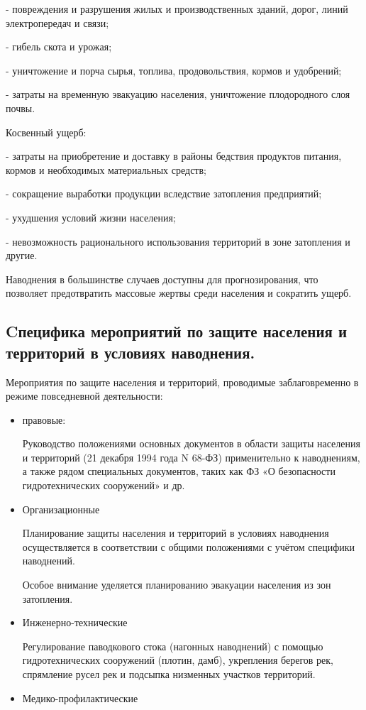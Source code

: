 \documentclass[a4paper, 12pt]{article}
\theoremstyle{definition}
\begin{document}
        - повреждения и разрушения жилых и производственных зданий, дорог, линий электропередач и связи;

        - гибель скота и урожая;

        - уничтожение и порча сырья, топлива, продовольствия, кормов и удобрений;

        - затраты на временную эвакуацию населения, уничтожение плодородного слоя почвы.

        Косвенный ущерб:

        - затраты на приобретение и доставку в районы бедствия продуктов питания, кормов и необходимых материальных средств;

        - сокращение выработки продукции вследствие затопления предприятий;

        - ухудшения условий жизни населения;

        - невозможность рационального использования территорий в зоне затопления и другие.
    
        Наводнения в большинстве случаев доступны для прогнозирования, что позволяет предотвратить массовые жертвы среди населения и сократить ущерб.

        \subsection{Cпецифика мероприятий по защите населения и территорий в условиях наводнения.}

        Мероприятия по защите населения и территорий, проводимые заблаговременно в режиме повседневной деятельности:

        \begin{itemize}
            \item правовые:
            
            Руководство положениями основных документов в области защиты населения и территорий (21 декабря 1994 года N 68-ФЗ) применительно к наводнениям, а также рядом специальных документов, таких как ФЗ «О безопасности гидротехнических сооружений» и др.
            \item Организационные 
            
            Планирование защиты населения и территорий в условиях наводнения осуществляется в соответствии с общими положениями с учётом специфики наводнений.

            Особое внимание уделяется планированию
            эвакуации населения из зон затопления.
            \item Инженерно-технические 
            
            Регулирование паводкового стока (нагонных наводнений) с помощью гидротехнических сооружений (плотин, дамб), укрепления берегов рек, спрямление русел рек и подсыпка низменных участков территорий.
            \item Медико-профилактические
        \end{itemize}
        
\end{document}
